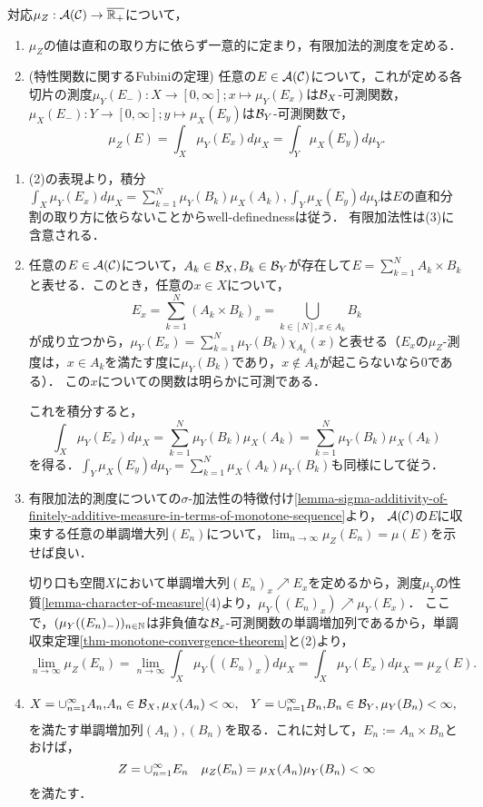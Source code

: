 \documentclass[uplatex, dvipdfmx]{jsreport}
\begin{document}
\begin{lemma}\label{lemma-integral-expression-of-product-measure}
    対応$\mu_Z:\mathcal{A}(\mathcal{C})\to\overline{\mathbb{R}_+}$について，
    \begin{enumerate}
        \item $\mu_Z$の値は直和の取り方に依らず一意的に定まり，有限加法的測度を定める．
        \item (特性関数に関するFubiniの定理) 任意の$E\in\mathcal{A}(\mathcal{C})$について，これが定める各切片の測度$\mu_Y(E_-):X\to[0,\infty];x\mapsto\mu_Y(E_x)$は$\mathcal{B}_X$-可測関数，$\mu_X(E_-):Y\to[0,\infty];y\mapsto\mu_X(E_y)$は$\mathcal{B}_Y$-可測関数で，
        \[\mu_Z(E)=\int_X\mu_Y(E_x)d\mu_X=\int_Y\mu_X(E_y)d\mu_Y.\]
    \end{enumerate}
\end{lemma}
\begin{Proof}\mbox{}
    \begin{enumerate}
        \item (2)の表現より，積分$\int_X\mu_Y(E_x)d\mu_X=\sum_{k=1}^N\mu_Y(B_k)\mu_X(A_k),\int_Y\mu_X(E_y)d\mu_Y$は$E$の直和分割の取り方に依らないことからwell-definednessは従う．
        有限加法性は(3)に含意される．
        \item 任意の$E\in\mathcal{A}(\mathcal{C})$について，$A_k\in\mathcal{B}_X,B_k\in\mathcal{B}_Y$が存在して$E=\sum_{k=1}^NA_k\times B_k$と表せる．このとき，任意の$x\in X$について，
        \[E_x=\sum^N_{k=1}(A_k\times B_k)_x=\bigcup_{k\in[N],x\in A_k}B_k\]
        が成り立つから，$\mu_Y(E_x)=\sum_{k=1}^N\mu_Y(B_k)\chi_{A_k}(x)$と表せる（$E_x$の$\mu_Z$-測度は，$x\in A_k$を満たす度に$\mu_Y(B_k)$であり，$x\notin A_k$が起こらないなら$0$である）．
        この$x$についての関数は明らかに可測である．

        これを積分すると，
        \[\int_X\mu_Y(E_x)d\mu_X=\sum_{k=1}^N\mu_Y(B_k)\mu_X(A_k)=\sum_{k=1}^N\mu_Y(B_k)\mu_X(A_k)\]
        を得る．$\int_Y\mu_X(E_y)d\mu_Y=\sum_{k=1}^N\mu_X(A_k)\mu_Y(B_k)$も同様にして従う．
        \item 
        有限加法的測度についての$\sigma$-加法性の特徴付け\ref{lemma-sigma-additivity-of-finitely-additive-measure-in-terms-of-monotone-sequence}より，
        $\mathcal{A}(\mathcal{C})$の$E$に収束する任意の単調増大列$(E_n)$について，$\lim_{n\to\infty}\mu_Z(E_n)=\mu(E)$を示せば良い．

        切り口も空間$X$において単調増大列$(E_n)_x\nearrow E_x$を定めるから，測度$\mu_Y$の性質\ref{lemma-character-of-measure}(4)より，$\mu_Y((E_n)_x)\nearrow\mu_Y(E_x)$．
        ここで，$(\mu_Y((E_n)_-))_{n\in\mathbb{N}}$は非負値な$\mathcal{B}_x$-可測関数の単調増加列であるから，単調収束定理\ref{thm-monotone-convergence-theorem}と(2)より，
        \[\lim_{n\to\infty}\mu_Z(E_n)=\lim_{n\to\infty}\int_X\mu_Y((E_n)_x)d\mu_X=\int_X\mu_Y(E_x)d\mu_X=\mu_Z(E).\]
        \item 
        \begin{align*}
            X=\cup_{n=1}^\infty A_n,&A_n\in\mathcal{B}_X,\mu_X(A_n)<\infty,&Y=\cup_{n=1}^\infty B_n,&B_n\in\mathcal{B}_Y,\mu_Y(B_n)<\infty,
        \end{align*}
        を満たす単調増加列$(A_n),(B_n)$を取る．これに対して，$E_n:=A_n\times B_n$とおけば，
        \[Z=\cup_{n=1}^\infty E_n\quad\mu_Z(E_n)=\mu_X(A_n)\mu_Y(B_n)<\infty\]
        を満たす．
    \end{enumerate}
\end{Proof}
\end{document}
